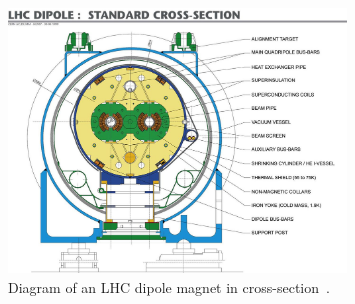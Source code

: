 \begin{figure}
\centering
\includegraphics[width=0.8\textwidth]{figures/lhc_and_cms/lhc_dipole.jpg}
\caption{Diagram of an LHC dipole magnet in cross-section~\cite{lhc_dipole}.}
\label{lhc_dipole}
\end{figure}
